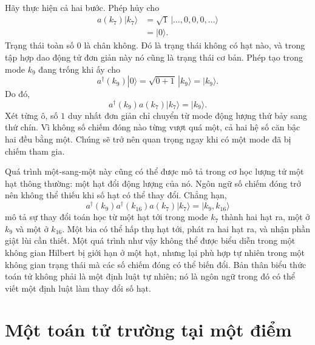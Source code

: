 \begin{classroomqa}
\end{classroomqa}

Hãy thực hiện cả hai bước. Phép hủy cho
\begin{align}
a(k_7)|k_7\rangle
&=
\sqrt{1}\,|\ldots,0,0,0,\ldots\rangle\\
&=|0\rangle.
\end{align}
Trạng thái toàn số 0 là chân không. Đó là trạng thái không có hạt nào, và trong tập hợp dao động tử đơn giản này nó cũng là trạng thái cơ bản. Phép tạo trong mode \(k_9\) đang trống khi ấy cho
\begin{equation}
a^\dagger(k_9)|0\rangle
=\sqrt{0+1}\,|k_9\rangle
=|k_9\rangle.
\end{equation}
Do đó,
\begin{equation}
a^\dagger(k_9)a(k_7)|k_7\rangle=|k_9\rangle.
\end{equation}
Xét từng ô, số \(1\) duy nhất đơn giản chỉ chuyển từ mode động lượng thứ bảy sang thứ chín. Vì không số chiếm đóng nào từng vượt quá một, cả hai hệ số căn bậc hai đều bằng một. Chúng sẽ trở nên quan trọng ngay khi có một mode đã bị chiếm tham gia.

Quá trình một-sang-một này cũng có thể được mô tả trong cơ học lượng tử một hạt thông thường: một hạt đổi động lượng của nó. Ngôn ngữ số chiếm đóng trở nên không thể thiếu khi số hạt có thể thay đổi. Chẳng hạn,
\begin{equation}
a^\dagger(k_9)a^\dagger(k_{16})a(k_7)|k_7\rangle
=|k_9,k_{16}\rangle
\end{equation}
mô tả sự thay đổi toán học từ một hạt tới trong mode \(k_7\) thành hai hạt ra, một ở \(k_9\) và một ở \(k_{16}\). Một bia có thể hấp thụ hạt tới, phát ra hai hạt ra, và nhận phần giật lùi cần thiết. Một quá trình như vậy không thể được biểu diễn trong một không gian Hilbert bị giới hạn ở một hạt, nhưng lại phù hợp tự nhiên trong một không gian trạng thái mà các số chiếm đóng có thể biến đổi. Bản thân biểu thức toán tử không phải là một định luật tự nhiên; nó là ngôn ngữ trong đó có thể viết một định luật làm thay đổi số hạt.

\section{Một toán tử trường tại một điểm}

